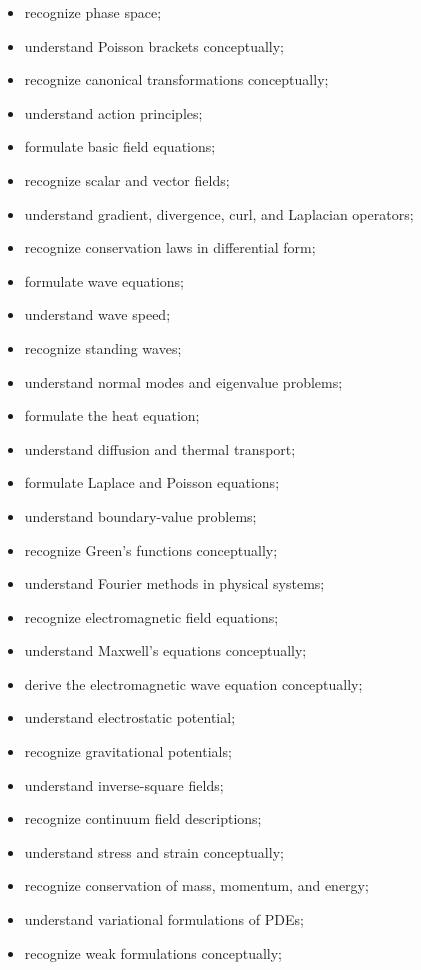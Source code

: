 {\begin{itemize}
    \item recognize phase space;
    \item understand Poisson brackets conceptually;
    \item recognize canonical transformations conceptually;
    \item understand action principles;
    \item formulate basic field equations;
    \item recognize scalar and vector fields;
    \item understand gradient, divergence, curl, and Laplacian operators;
    \item recognize conservation laws in differential form;
    \item formulate wave equations;
    \item understand wave speed;
    \item recognize standing waves;
    \item understand normal modes and eigenvalue problems;
    \item formulate the heat equation;
    \item understand diffusion and thermal transport;
    \item formulate Laplace and Poisson equations;
    \item understand boundary-value problems;
    \item recognize Green's functions conceptually;
    \item understand Fourier methods in physical systems;
    \item recognize electromagnetic field equations;
    \item understand Maxwell's equations conceptually;
    \item derive the electromagnetic wave equation conceptually;
    \item understand electrostatic potential;
    \item recognize gravitational potentials;
    \item understand inverse-square fields;
    \item recognize continuum field descriptions;
    \item understand stress and strain conceptually;
    \item recognize conservation of mass, momentum, and energy;
    \item understand variational formulations of PDEs;
    \item recognize weak formulations conceptually;

\end{itemize}}
